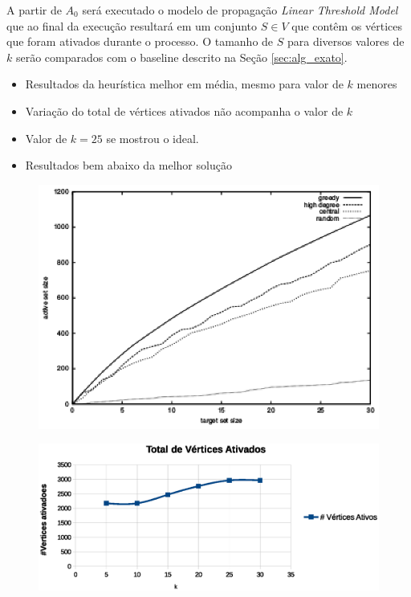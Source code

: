 \documentclass[12pt]{article}
\begin{document}
A partir de $A_{0}$ será executado o modelo de propagação \textit{Linear Threshold Model} que ao final da execução resultará em um conjunto $S \in V$ que contêm os vértices que foram ativados durante o processo. O tamanho de $S$ para diversos valores de $k$ serão comparados com o baseline descrito na  Seção \ref{sec:alg_exato}{}.

\begin{itemize}
		
		\item Resultados da heurística melhor em média, mesmo para valor de $k$ menores
		\item Variação do total de vértices ativados não acompanha o valor de $k$
		\item Valor de $k= 25$ se mostrou o ideal.
		\item Resultados bem abaixo da melhor solução \cite{Hochbaum:1996:ACP:241938.241941} 		
		
	\end{itemize}	


\begin{figure}[!t]
	\centering
	\includegraphics[width=5.0in]{../img/grafico_baseline.eps}
	\label{fig_vertex_cover}
	
\end{figure}


\begin{figure}[!t]
	\centering
	\includegraphics[width=6.5in]{../img/grafico_total.eps}
	\label{fig_vertex_cover}

\end{figure}
\end{document}
